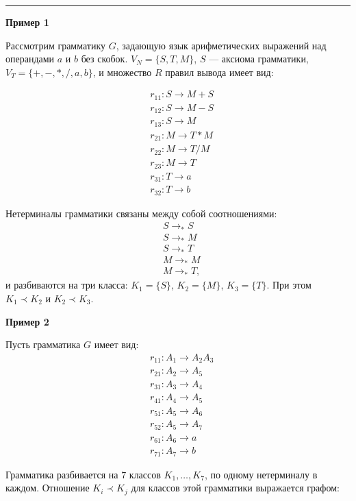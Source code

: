 \documentclass[12pt]{article}
\begin{document}
\noindent\rule{15cm}{0.4pt}

{\small
\textbf{Пример 1}

Рассмотрим грамматику $G$, задающую язык арифметических выражений над операндами $a$ и $b$ без скобок. $V_N = \{S, T, M\}$, $S$ --- аксиома грамматики, $V_T = \{+, -, *, /, a, b\}$, и множество $R$ правил вывода имеет вид:

\begin{align*}
    & r_{11} : S \rightarrow M + S \\
    & r_{12} : S \rightarrow M - S \\
    & r_{13} : S \rightarrow M \\
    & r_{21} : M \rightarrow T * M \\
    & r_{22} : M \rightarrow T / M \\
    & r_{23} : M \rightarrow T \\
    & r_{31} : T \rightarrow a \\
    & r_{32} : T \rightarrow b
\end{align*}

Нетерминалы грамматики связаны между собой соотношениями:
\begin{align*}
    &S \rightarrow_* S \\
    &S \rightarrow_* M \\
    &S \rightarrow_* T \\
    &M \rightarrow_* M \\
    &M \rightarrow_* T,
\end{align*}
и разбиваются на три класса: $K_1 = \{ S \}$, $K_2 = \{ M \}$, $K_3 = \{ T \}$. При этом $K_1 \prec K_2$ и $K_2 \prec K_3$.

\textbf{Пример 2}

Пусть грамматика $G$ имеет вид:
\begin{align*}
    & r_{11} : A_1 \rightarrow A_2 A_3 \\
    & r_{21} : A_2 \rightarrow A_5     \\
    & r_{31} : A_3 \rightarrow A_4     \\
    & r_{41} : A_4 \rightarrow A_5     \\
    & r_{51} : A_5 \rightarrow A_6     \\
    & r_{52} : A_5 \rightarrow A_7     \\
    & r_{61} : A_6 \rightarrow a       \\
    & r_{71} : A_7 \rightarrow b
\end{align*}

Грамматика разбивается на $7$ классов $K_1, \ldots, K_7$, по одному нетерминалу в каждом. Отношение $K_i \prec K_j$ для классов этой грамматики выражается графом:

}
\end{document}
